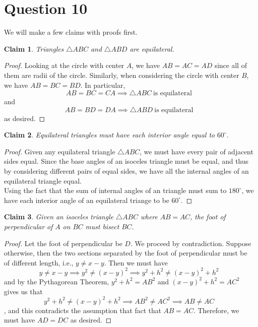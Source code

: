 \documentclass{article}
\newtheorem*{claim}{Claim}
\begin{document}
\section*{Question 10}
We will make a few claims with proofs first.
\begin{claim}
  Triangles $\triangle ABC$ and $\triangle ABD$ are equilateral.
\end{claim}
\begin{proof}
Looking at the circle with center $A$, we have $AB=AC=AD$ since all of them are
radii of the circle. Similarly, when considering the circle with center $B$, we
have $AB=BC=BD$. In particular,
\[ AB=BC=CA \implies \triangle ABC\ \text{is equilateral} \]
and
\[ AB=BD=DA \implies \triangle ABD\ \text{is equilateral} \]
as desired.
\end{proof}
\begin{claim}
Equilateral triangles must have each interior angle equal to $60^{\circ}$.
\end{claim}
\begin{proof}
  Given any equilateral triangle $\triangle ABC$, we must have every pair of adjacent
  sides equal. Since the base angles of an isoceles triangle must be equal, and
  thus by considering different pairs of equal sides, we have all the internal
  angles of an equilateral triangle equal.\\
  Using the fact that the sum of internal angles of an triangle must sum to
  $180^{\circ}$, we have each interior angle of an equilateral triange to be $60^{\circ}$.
\end{proof}
\begin{claim}
Given an isoceles triangle $\triangle ABC$ where $AB=AC$, the foot of perpendicular of $A$
on $BC$ must bisect $BC$.
\end{claim}
  \begin{center}
  \end{center}
\begin{proof}
  Let the foot of perpendicular be $D$. We proceed by contradiction. Suppose
  otherwise, then the two sections separated by the foot of perpendicular must
  be of different length, i.e., $y\neq x-y$. Then we must have
  \[y\neq x-y \implies y^{2}\neq(x-y)^{2} \implies y^{2}+h^{2}\neq(x-y)^{2}+h^{2}\]
  and by the Pythagorean Theorem, $y^{2}+h^{2}=AB^{2}$ and
  $(x-y)^{2}+h^{2}=AC^{2}$ gives us that
  \[y^{2}+h^{2}\neq(x-y)^{2}+h^{2}\implies AB^{2}\neq AC^{2}\implies AB\neq AC\],
  and this contradicts the assumption that fact that $AB=AC$. Therefore, we must
  have $AD=DC$ as desired.
  \end{proof}
\end{document}

